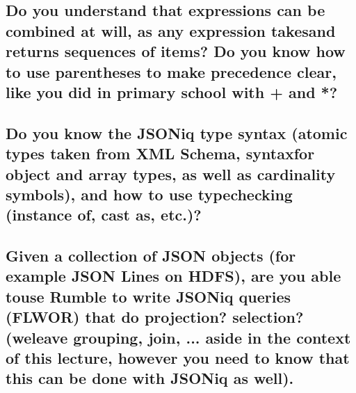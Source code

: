 \documentclass{article}
\begin{document}
\subsection{Do you understand that expressions can be combined at will, as any expression takesand returns sequences of items? Do you know how to use parentheses to make precedence clear, like you did in primary school with + and *?}
\subsection{Do you know the JSONiq type syntax (atomic types taken from XML Schema, syntaxfor object and array types, as well as cardinality symbols), and how to use typechecking (instance of, cast as, etc.)?}
\subsection{Given a collection of JSON objects (for example JSON Lines on HDFS), are you able touse Rumble to write JSONiq queries (FLWOR) that do projection? selection? (weleave grouping, join, ... aside in the context of this lecture, however you need to know that this can be done with JSONiq as well).}

\end{document}
